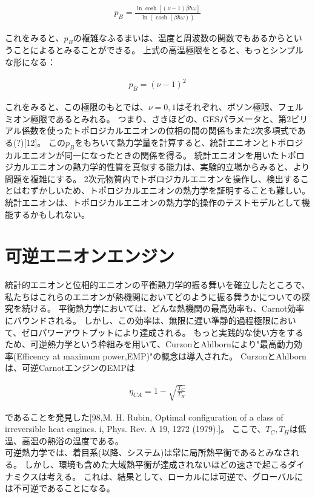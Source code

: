 \documentclass[a4paper,11pt]{jsarticle}
\numberwithin{equation}{section}
\begin{document}
\begin{align}
p_B = \frac{\ln{\cosh\left[(\nu-1)\beta\hbar\omega\right]}}{\ln\left(\cosh(\beta\hbar\omega)\right)}
\end{align}

これをみると、$p_B$の複雑なふるまいは、温度と周波数の関数でもあるからということによるとみることができる。
上式の高温極限をとると、もっとシンプルな形になる：

\begin{align}
p_B=(\nu-1)^2
\end{align}

これをみると、この極限のもとでは、$\nu=0,1$はそれぞれ、ボソン極限、フェルミオン極限であるとみれる。
つまり、さきほどの、GESパラメータと、第2ビリアル係数を使ったトポロジカルエニオンの位相の間の関係もまた2次多項式である(?)[12]。
この$p_B$をもちいて熱力学量を計算すると、統計エニオンとトポロジカルエニオンが同一になったときの関係を得る。
統計エニオンを用いたトポロジカルエニオンの熱力学的性質を真似する能力は、実験的立場からみると、より問題を複雑にする。
2次元物質内でトポロジカルエニオンを操作し、検出することはむずかしいため、トポロジカルエニオンの熱力学を証明することも難しい。
統計エニオンは、トポロジカルエニオンの熱力学的操作のテストモデルとして機能するかもしれない。

\section{可逆エニオンエンジン}
統計的エニオンと位相的エニオンの平衡熱力学的振る舞いを確立したところで、私たちはこれらのエニオンが熱機関においてどのように振る舞うかについての探究を続ける。
平衡熱力学においては、どんな熱機関の最高効率も、Carnot効率にバウンドされる。
しかし、この効率は、無限に遅い準静的過程極限において、ゼロパワーアウトプットにより達成される。
もっと実践的な使い方をするため、可逆熱力学という枠組みを用いて、CurzonとAhlbornにより"最高動力効率(Efficency at maximum power,EMP)"の概念は導入された。
CurzonとAhlbornは、可逆CarnotエンジンのEMPは

\begin{align}
\eta_{CA}=1-\sqrt{\frac{T_C}{T_H}}
\end{align}

であることを発見した[98,M. H. Rubin, Optimal configuration of a class of irreversible heat engines. i, Phys. Rev. A 19, 1272 (1979).]。
ここで、$T_C,T_H$は低温、高温の熱浴の温度である。\\

可逆熱力学では、着目系(以降、システム)は常に局所熱平衡であるとみなされる。
しかし、環境も含めた大域熱平衡が達成されないほどの速さで起こるダイナミクスは考える。
これは、結果として、ローカルには可逆で、グローバルには不可逆であることになる。
\end{document}

